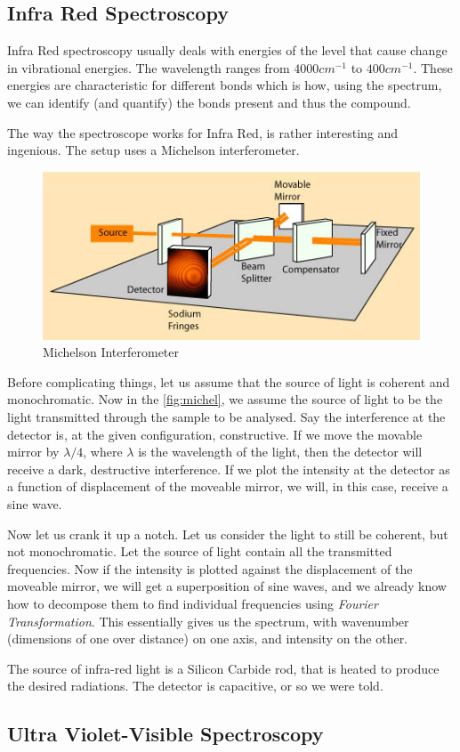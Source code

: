 \subsection{Infra Red Spectroscopy}
Infra Red spectroscopy usually deals with energies of the level that cause change in vibrational energies. The wavelength ranges from $4000 cm^{-1}$ to $400 cm^{-1}$. These energies are characteristic for different bonds which is how, using the spectrum, we can identify (and quantify) the bonds present and thus the compound.
\par
The way the spectroscope works for Infra Red, is rather interesting and ingenious. The setup uses a Michelson interferometer. \\
\begin{figure}[bth]
	\begin{center}
		\includegraphics[width=.8\linewidth]{gfx/michel}
	\end{center}
\caption[Michelson Interferometer]{Michelson Interferometer \citep{michel:img}}\label{fig:michel}
\end{figure}
\par
Before complicating things, let us assume that the source of light is coherent and monochromatic.  Now in the \autoref{fig:michel}, we assume the source of light to be the light transmitted through the sample to be analysed. Say the interference at the detector is, at the given configuration, constructive. If we move the movable mirror by $\lambda / 4$, where $\lambda$ is the wavelength of the light, then the detector will receive a dark, destructive interference. If we plot the intensity at the detector as a function of displacement of the moveable mirror, we will, in this case, receive a sine wave.
\par
Now let us crank it up a notch. Let us consider the light to still be coherent, but not monochromatic. Let the source of light contain all the transmitted frequencies.  Now if the intensity is plotted against the displacement of the moveable mirror, we will get a superposition of sine waves, and we already know how to decompose them to find individual frequencies using \emph{Fourier Transformation}. This essentially gives us the spectrum, with wavenumber (dimensions of one over distance) on one axis, and intensity on the other.
\par
The source of infra-red light is a Silicon Carbide rod, that is heated to produce the desired radiations.  The detector is capacitive, or so we were told. 
\subsection{Ultra Violet-Visible Spectroscopy}
